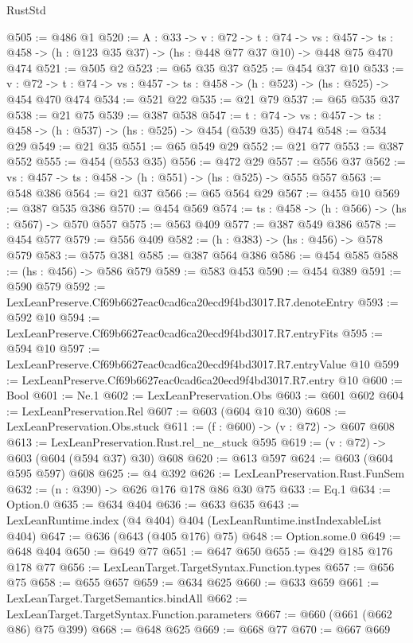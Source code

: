 \begin{lexlean}{RustStd}
\begin{coremodule}
@505 := @486 @1
@520 := {A : @33} ->
  {v : @72} ->
  {t : @74} ->
  {vs : @457} -> {ts : @458} -> (h : @123 @35 @37) -> (hs : @448 @77 @37 @10) -> @448 @75 @470 @474
@521 := @505 @2
@523 := @65 @35 @37
@525 := @454 @37 @10
@533 := {v : @72} ->
  {t : @74} -> {vs : @457} -> {ts : @458} -> (h : @523) -> (hs : @525) -> @454 @470 @474
@534 := @521 @22
@535 := @21 @79
@537 := @65 @535 @37
@538 := @21 @75
@539 := @387 @538
@547 := {t : @74} -> {vs : @457} -> {ts : @458} -> (h : @537) -> (hs : @525) -> @454 (@539 @35) @474
@548 := @534 @29
@549 := @21 @35
@551 := @65 @549 @29
@552 := @21 @77
@553 := @387 @552
@555 := @454 (@553 @35)
@556 := @472 @29
@557 := @556 @37
@562 := {vs : @457} -> {ts : @458} -> (h : @551) -> (hs : @525) -> @555 @557
@563 := @548 @386
@564 := @21 @37
@566 := @65 @564 @29
@567 := @455 @10
@569 := @387 @535 @386
@570 := @454 @569
@574 := {ts : @458} -> (h : @566) -> (hs : @567) -> @570 @557
@575 := @563 @409
@577 := @387 @549 @386
@578 := @454 @577
@579 := @556 @409
@582 := (h : @383) -> (hs : @456) -> @578 @579
@583 := @575 @381
@585 := @387 @564 @386
@586 := @454 @585
@588 := (hs : @456) -> @586 @579
@589 := @583 @453
@590 := @454 @389
@591 := @590 @579
@592 := LexLeanPreserve.Cf69b6627eac0cad6ca20ecd9f4bd3017.R7.denoteEntry
@593 := @592 @10
@594 := LexLeanPreserve.Cf69b6627eac0cad6ca20ecd9f4bd3017.R7.entryFits
@595 := @594 @10
@597 := LexLeanPreserve.Cf69b6627eac0cad6ca20ecd9f4bd3017.R7.entryValue @10
@599 := LexLeanPreserve.Cf69b6627eac0cad6ca20ecd9f4bd3017.R7.entry @10
@600 := Bool
@601 := Ne.{1}
@602 := LexLeanPreservation.Obs
@603 := @601 @602
@604 := LexLeanPreservation.Rel
@607 := @603 (@604 @10 @30)
@608 := LexLeanPreservation.Obs.stuck
@611 := (f : @600) -> (v : @72) -> @607 @608
@613 := LexLeanPreservation.Rust.rel_ne_stuck @595
@619 := (v : @72) -> @603 (@604 (@594 @37) @30) @608
@620 := @613 @597
@624 := @603 (@604 @595 @597) @608
@625 := @4 @392
@626 := LexLeanPreservation.Rust.FunSem
@632 := (n : @390) -> @626 @176 @178 @86 @30 @75
@633 := Eq.{1}
@634 := Option.{0}
@635 := @634 @404
@636 := @633 @635
@643 := LexLeanRuntime.index (@4 @404) @404 (LexLeanRuntime.instIndexableList @404)
@647 := @636 (@643 (@405 @176) @75)
@648 := Option.some.{0}
@649 := @648 @404
@650 := @649 @77
@651 := @647 @650
@655 := @429 @185 @176 @178 @77
@656 := LexLeanTarget.TargetSyntax.Function.types
@657 := @656 @75
@658 := @655 @657
@659 := @634 @625
@660 := @633 @659
@661 := LexLeanTarget.TargetSemantics.bindAll
@662 := LexLeanTarget.TargetSyntax.Function.parameters
@667 := @660 (@661 (@662 @86) @75 @399)
@668 := @648 @625
@669 := @668 @77
@670 := @667 @669

\end{coremodule}
\end{lexlean}
